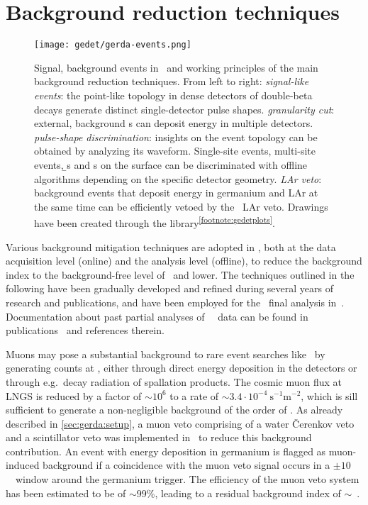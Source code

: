 \section{Background reduction techniques}%
\label{sec:gerda:cuts}

\begin{figure}
  \centering
  \texttt{[image: gedet/gerda-events.png]}
  \caption{%
    Signal, background events in \gerda\ and working principles of the main background
    reduction techniques. From left to right: \emph{signal-like events}: the point-like
    topology in dense detectors of double-beta decays generate distinct single-detector
    pulse shapes. \emph{granularity cut}: external, background \g{}s can deposit energy
    in multiple detectors. \emph{pulse-shape discrimination}: insights on the event
    topology can be obtained by analyzing its waveform. Single-site events, multi-site
    events, \b{}s and \a{}s on the surface can be discriminated with offline algorithms
    depending on the specific detector geometry. \emph{LAr veto}: background events that
    deposit energy in germanium and LAr at the same time can be efficiently vetoed by
    the \gerda\ LAr veto. Drawings have been
    created through the  library\textsuperscript{\ref{footnote:gedetplots}}.
  }\label{fig:gerda:event-types}
\end{figure}

Various background mitigation techniques are adopted in \gerda, both at the data
acquisition level (online) and the analysis level (offline), to reduce the background
index to the background-free level of \pIIbi\ and lower. The techniques outlined in the
following have been gradually developed and refined during several years of research and
publications, and have been employed for the \phasetwo\ final analysis
in~\cite{Kermaidic2020, Agostini2021}.  Documentation about past partial analyses of
\gerda\ \phasetwo\ data can be found in publications~\cite{Agostini2015a, Agostini2017,
Agostini2018, Agostini2019a} and references therein.

Muons may pose a substantial background to rare event searches like \gerda\ by generating
counts at \qbb, either through direct energy deposition in the detectors or through
e.g.~decay radiation of spallation products. The cosmic muon flux at LNGS is reduced by a
factor of ${\sim}10^6$ to a rate of ${\sim}3.4 \cdot 10^{−4}~\text{s}^{-1}\text{m}^{-2}$,
which is sill sufficient to generate a non-negligible background of the order of
.  As already described in \cref{sec:gerda:setup}, a muon veto comprising of
a water \v{C}erenkov veto and a scintillator veto was implemented in \gerda\ to reduce
this background contribution. An event with energy deposition in germanium is flagged
as muon-induced background if a coincidence with the muon veto signal occurs in a $\pm
10$~\mus\ window around the germanium trigger. The efficiency of the muon veto system
has been estimated to be of ${\sim}99$\%, leading to a residual background index of
${\sim}$~\cite{Freund2016}.

